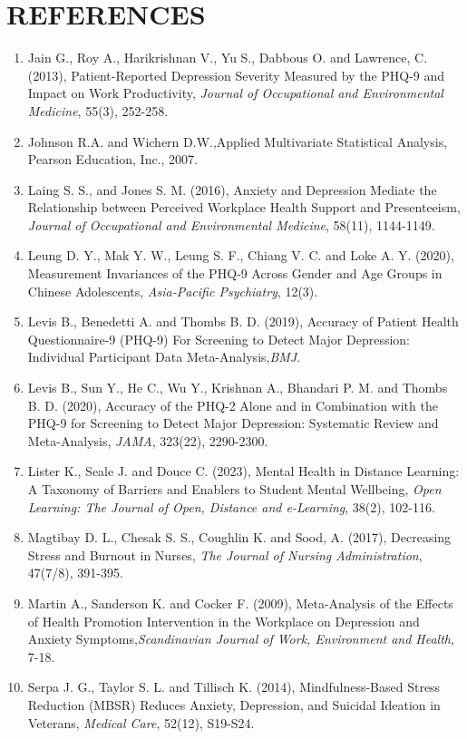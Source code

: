 \documentclass[12pt]{article}
\numberwithin{equation}{section}
\begin{document}
\section*{REFERENCES}
\begin{enumerate}
	\item Jain G., Roy A., Harikrishnan V., Yu S., Dabbous O. and Lawrence, C. (2013), Patient-Reported Depression Severity Measured by the PHQ-9 and Impact on Work Productivity, \emph{Journal of Occupational and Environmental Medicine}, 55(3), 252-258.
	\item Johnson R.A. and Wichern D.W.,Applied Multivariate Statistical Analysis, Pearson Education, Inc., 2007.
	
	\item Laing S. S., and Jones S. M. (2016), Anxiety and Depression Mediate the Relationship between Perceived Workplace Health Support and Presenteeism, \emph{Journal of Occupational and Environmental Medicine}, 58(11), 1144-1149.
	
	\item Leung D. Y., Mak Y. W., Leung S. F., Chiang V. C. and Loke A. Y. (2020), Measurement Invariances of the PHQ‐9 Across Gender and Age Groups in Chinese Adolescents,\emph{ Asia‐Pacific Psychiatry}, 12(3).
	
	\item Levis B., Benedetti A. and Thombs B. D. (2019), Accuracy of Patient Health Questionnaire-9 (PHQ-9) For Screening to Detect Major Depression: Individual Participant Data Meta-Analysis,\emph{BMJ}.
	
	\item Levis B., Sun Y., He C., Wu Y., Krishnan A., Bhandari P. M. and Thombs B. D. (2020), Accuracy of the PHQ-2 Alone and in Combination with the PHQ-9 for Screening to Detect Major Depression: Systematic Review and Meta-Analysis,\emph{ JAMA}, 323(22), 2290-2300.
	
	\item Lister K., Seale J. and Douce C. (2023), Mental Health in Distance Learning: A Taxonomy of Barriers and Enablers to Student Mental Wellbeing, \emph{Open Learning: The Journal of Open, Distance and e-Learning}, 38(2), 102-116.
	
	\item Magtibay D. L., Chesak S. S., Coughlin K. and Sood, A. (2017), Decreasing Stress and Burnout in Nurses, \emph{The Journal of Nursing Administration}, 47(7/8), 391-395.
	
	\item Martin A., Sanderson K. and Cocker F. (2009), Meta-Analysis of the Effects of Health Promotion Intervention in the Workplace on Depression and Anxiety Symptoms,\emph{Scandinavian Journal of Work, Environment and Health}, 7-18.
	
	\item Serpa J. G., Taylor S. L. and Tillisch K. (2014), Mindfulness-Based Stress Reduction (MBSR) Reduces Anxiety, Depression, and Suicidal Ideation in Veterans, \emph{Medical Care}, 52(12), S19-S24.
\end{enumerate}
\end{document}
